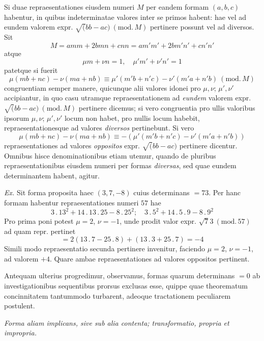 Si duae repraesentationes eiusdem numeri $M$ per eandem formam $(a,b,c)$ habentur, in quibus indeterminatae valores inter se primos habent: hae vel ad eundem valorem expr. $\surd(bb-ac)\ (\mathrm{mod.}\,M)$ pertinere possunt vel ad diversos. Sit
\[
M=amm+2bmn+cnn=am'm'+2bm'n'+cn'n'
\]
atque
\[
\mu m+\nu n=1,\quad \mu'm'+\nu'n'=1
\]
patetque si fuerit
\[
\mu(mb+nc)-\nu(ma+nb)\equiv\mu'(m'b+n'c)-\nu'(m'a+n'b)\ (\mathrm{mod.}\,M)
\]
congruentiam semper manere, quicunque alii valores idonei pro $\mu,\nu$; $\mu',\nu'$ accipiantur, in quo casu utramque repraesentationem ad \textit{eundem} valorem expr. $\surd(bb-ac)\ (\mathrm{mod.}\,M)$ pertinere dicemus; si vero congruentia pro ullis valoribus ipsorum $\mu,\nu$; $\mu',\nu'$ locum non habet, pro nullis locum habebit, repraesentationesque ad valores \textit{diversos} pertinebunt. Si vero
\[
\mu(mb+nc)-\nu(ma+nb)\equiv-(\mu'(m'b+n'c)-\nu'(m'a+n'b))
\]
repraesentationes ad valores \textit{oppositos} expr. $\surd(bb-ac)$ pertinere dicentur. Omnibus hisce denominationibus etiam utemur, quando de pluribus repraesentationibus eiusdem numeri per formas \textit{diversas}, sed quae eundem determinantem habent, agitur.

\textit{Ex.} Sit forma proposita haec $(3,7,-8)$ cuius determinans $=73$. Per hanc formam habentur repraesentationes numeri $57$ hae
\[
3\mathbin{.}13^2+14\mathbin{.}13\mathbin{.}25-8\mathbin{.}25^2;\quad
3\mathbin{.}5^2+14\mathbin{.}5\mathbin{.}9-8\mathbin{.}9^2
\]
Pro prima poni potest $\mu=2$, $\nu=-1$, unde prodit valor expr. $\surd73\ (\mathrm{mod.}\,57)$ ad quam repr. pertinet
\[
{}=2(13\mathbin{.}7-25\mathbin{.}8)+(13\mathbin{.}3+25\mathbin{.}7)=-4
\]
Simili modo repraesentatio secunda pertinere invenitur, faciendo $\mu=2$, $\nu=-1$, ad valorem $+4$. Quare ambae repraesentationes ad valores oppositos pertinent.

Antequam ulterius progredimur, observamus, formas quarum determinans $=0$ ab investigationibus sequentibus prorsus exclusas esse, quippe quae theorematum concinnitatem tantummodo turbarent, adeoque tractationem peculiarem postulent.

\begin{center}
\textit{Forma aliam implicans, sive sub alia contenta; transformatio, propria et impropria.}
\end{center}

